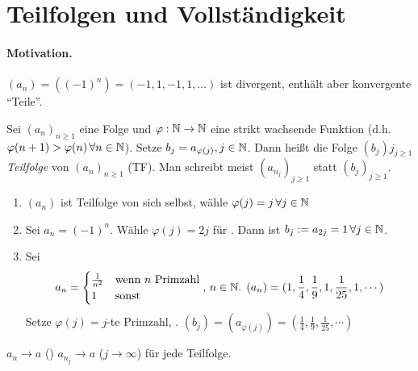 \documentclass[12pt]{scrreprt}
\begin{document}
\section{Teilfolgen und Vollständigkeit}
\label{sec:konv.teilfolgen}

\paragraph{Motivation.} $(a_n) = ((-1)^n) = (-1,1,-1,1,\dotsc)$ ist
divergent, enthält aber konvergente "`Teile"'.

\begin{dfn}
  \label{dfn:konv.teilfolge}
  Sei $(a_n)_{n\ge1}$ eine Folge und $\varphi: \mathbb{N} \rightarrow
  \mathbb{N}$ eine strikt wachsende Funktion
  (d.h. $\varphi(n+1)>\varphi(n)\,\forall n\in\mathbb{N}$). Setze
  $b_j=a_{\varphi(j)}, j\in\mathbb{N}$. Dann heißt die Folge $(b_j)j_{j\ge1}$
  \emph{Teilfolge} von $(a_n)_{n\ge1}$ (TF). Man schreibt meist
  $\left(a_{n_j}\right)_{j\ge1}$ statt $(b_j)_{j\ge1}$.
\end{dfn}

\begin{bsp*}
  \begin{enumerate}
  \item $(a_n)$ ist Teilfolge von sich selbst, wähle
    $\varphi(j)=j\,\forall j\in\mathbb{N}$
  \item Sei $a_n=(-1)^n$. Wähle $\varphi(j)=2j$ für . Dann ist
    $b_j:=a_{2j}=1 \,\forall j\in\mathbb{N}$.
  \item Sei \[a_n = \begin{cases} \frac{1}{n^2} & \text{wenn } n \text{
        Primzahl} \\ 1 & \text{sonst} \end{cases} \text{, } n\in\mathbb{N}
    \text{. } (a_n) = (1, \frac14, \frac19, 1, \frac{1}{25}, 1,
    \dotsm)\] Setze $\varphi(j)=j$-te Primzahl, . \folgt $(b_j)
    = (a_{\varphi(j)}) = (\frac14, \frac19, \frac{1}{25},\dotsm)$
  \end{enumerate}
\end{bsp*}

\begin{bem*}
  $a_n\to a$ (\ninf) \folgt $a_{n_j}\to a$ ($j\to\infty$) für jede
  Teilfolge.
\end{bem*}
\end{document}
